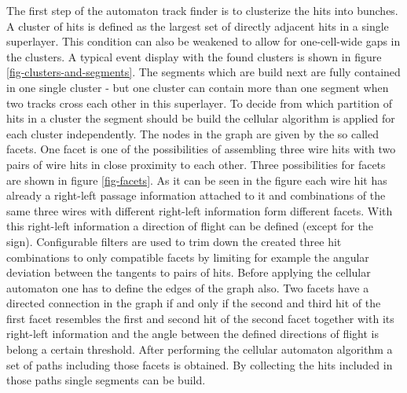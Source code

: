 The first step of the automaton track finder is to clusterize the hits into bunches. A cluster of hits is defined as the largest set of directly adjacent hits in a single superlayer. This condition can also be weakened to allow for one-cell-wide gaps in the clusters. A typical event display with the found clusters is shown in figure \ref{fig-clusters-and-segments}. The segments which are build next are fully contained in one single cluster - but one cluster can contain more than one segment when two tracks cross each other in this superlayer. To decide from which partition of hits in a cluster the segment should be build the cellular algorithm is applied for each cluster independently. The nodes in the graph are given by the so called facets. One facet is one of the possibilities of assembling three wire hits with two pairs of wire hits in close proximity to each other. Three possibilities for facets are shown in figure \ref{fig-facets}. As it can be seen in the figure each wire hit has already a right-left passage information attached to it and combinations of the same three wires with different right-left information form different facets. With this right-left information a direction of flight can be defined (except for the sign). Configurable filters are used to trim down the created three hit combinations to only compatible facets by limiting for example the angular deviation between the tangents to pairs of hits. Before applying the cellular automaton one has to define the edges of the graph also. Two facets have a directed connection in the graph if and only if the second and third hit of the first facet resembles the first and second hit of the second facet together with its right-left information and the angle between the defined directions of flight is belong a certain threshold. After performing the cellular automaton algorithm a set of paths including those facets is obtained. By collecting the hits included in those paths single segments can be build.

